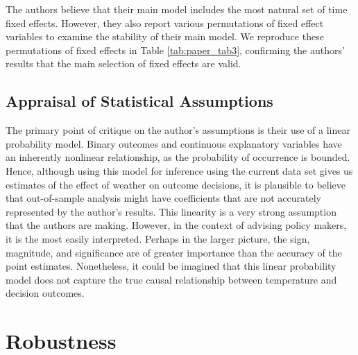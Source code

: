 \documentclass{article}
\begin{document}
	The authors believe that their main model includes the most natural set of time fixed effects. However, they also report various permutations of fixed effect variables to examine the stability of their main model. We reproduce these permutations of fixed effects in Table \ref{tab:paper_tab3}, confirming the authors' results that the main selection of fixed effects are valid. 
	
	\subsection{Appraisal of Statistical Assumptions}
	
	The primary point of critique on the author's assumptions is their use of a linear probability model. Binary outcomes and continuous explanatory variables have an inherently nonlinear relationship, as the probability of occurrence is bounded. Hence, although using this model for inference using the current data set gives us estimates of the effect of weather on outcome decisions, it is plausible to believe that out-of-sample analysis might have coefficients that are not accurately represented by the author's results. This linearity is a very strong assumption that the authors are making. However, in the context of advising policy makers, it is the most easily interpreted. Perhaps in the larger picture, the sign, magnitude, and significance are of greater importance than the accuracy of the point estimates. Nonetheless, it could be imagined that this linear probability model does not capture the true causal relationship between temperature and decision outcomes. 
	
	\section{Robustness} 
	
	
	
\end{document}
